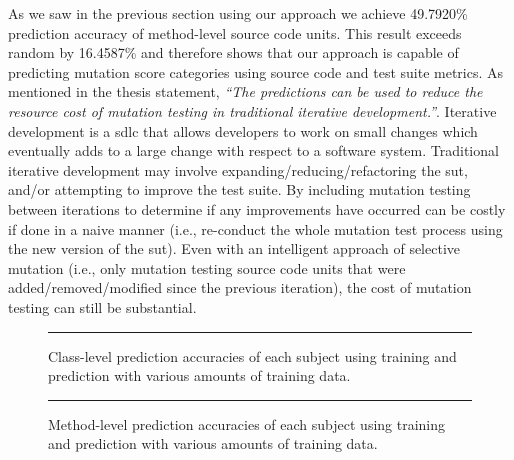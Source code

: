 \noindent
As we saw in the previous section using our approach we achieve 49.7920\% prediction accuracy of method-level source code units. This result exceeds random by 16.4587\% and therefore shows that our approach is capable of predicting mutation score categories using source code and test suite metrics. As mentioned in the thesis statement, \emph{``The predictions can be used to reduce the resource cost of mutation testing in traditional iterative development.''}. Iterative development is a \gls{sdlc} that allows developers to work on small changes which eventually adds to a large change with respect to a software system. Traditional iterative development may involve expanding/reducing/refactoring the \gls{sut}, and/or attempting to improve the test suite. By including mutation testing between iterations to determine if any improvements have occurred can be costly if done in a naive manner (i.e., re-conduct the whole mutation test process using the new version of the \gls{sut}). Even with an intelligent approach of selective mutation (i.e., only mutation testing source code units that were added/removed/modified since the previous iteration), the cost of mutation testing can still be substantial.

\begin{figure}[!ht]
  \centering
  \begin{adjustbox}{max size={.95\textwidth}{.95\textheight}}
    
  \end{adjustbox}
  \caption{Class-level prediction accuracies of each subject using training and prediction with various amounts of training data.}
  \vspace{2mm}
  \hrule
  \label{fig:divisor_class_graph}
\end{figure}

\begin{figure}[!ht]
  \centering
  \begin{adjustbox}{max size={.95\textwidth}{.95\textheight}}
    
  \end{adjustbox}
  \caption{Method-level prediction accuracies of each subject using training and prediction with various amounts of training data.}
  \vspace{2mm}
  \hrule
  \label{fig:divisor_method_graph}
\end{figure}

